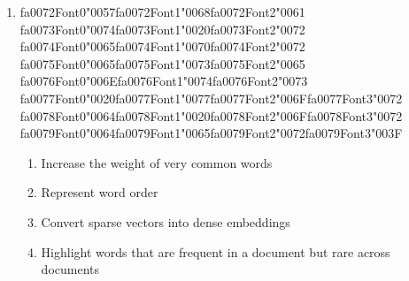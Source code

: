 \documentclass[12pt]{article}
\begin{document}
\begin{enumerate}[label=Q\arabic*.]
\item {\csname fa0072Font0\endcsname\char"0057}{\csname fa0072Font1\endcsname\char"0068}{\csname fa0072Font2\endcsname\char"0061} {\csname fa0073Font0\endcsname\char"0074}{\csname fa0073Font1\endcsname\char"0020}{\csname fa0073Font2\endcsname\char"0072} {\csname fa0074Font0\endcsname\char"0065}{\csname fa0074Font1\endcsname\char"0070}{\csname fa0074Font2\endcsname\char"0072} {\csname fa0075Font0\endcsname\char"0065}{\csname fa0075Font1\endcsname\char"0073}{\csname fa0075Font2\endcsname\char"0065} {\csname fa0076Font0\endcsname\char"006E}{\csname fa0076Font1\endcsname\char"0074}{\csname fa0076Font2\endcsname\char"0073} {\csname fa0077Font0\endcsname\char"0020}{\csname fa0077Font1\endcsname\char"0077}{\csname fa0077Font2\endcsname\char"006F}{\csname fa0077Font3\endcsname\char"0072} {\csname fa0078Font0\endcsname\char"0064}{\csname fa0078Font1\endcsname\char"0020}{\csname fa0078Font2\endcsname\char"006F}{\csname fa0078Font3\endcsname\char"0072} {\csname fa0079Font0\endcsname\char"0064}{\csname fa0079Font1\endcsname\char"0065}{\csname fa0079Font2\endcsname\char"0072}{\csname fa0079Font3\endcsname\char"003F}
\begin{enumerate}[label=(\Alph*)]
    \item Increase the weight of very common words
    \item Represent word order
    \item Convert sparse vectors into dense embeddings
    \item Highlight words that are frequent in a document but rare across documents
\end{enumerate}
\newpage %

\end{enumerate}
\end{document}
